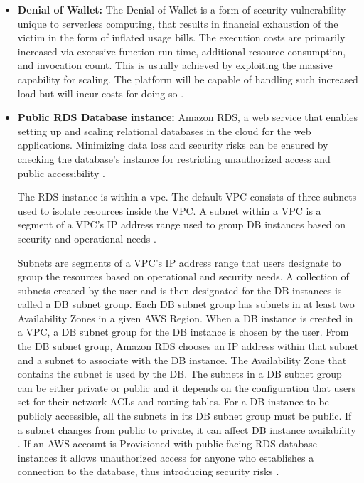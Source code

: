 \begin{itemize}
    \item \textbf{Denial of Wallet:} The Denial of Wallet is a form of security vulnerability unique to serverless
    computing,
    that results in financial exhaustion of the victim in the form of inflated usage bills.
    The execution costs are
    primarily increased via excessive function run time, additional resource consumption, and invocation count.
    This
    is usually achieved by exploiting the massive capability for scaling.
    The platform will be capable of handling
    such increased load but will incur costs for doing so \cite{54} \cite{55} \cite{56}.
\end{itemize}

\begin{itemize}
    \item \textbf{Public RDS Database instance:} Amazon RDS, a web service that enables setting up and scaling
    relational databases in the cloud for the web applications.
    Minimizing data loss and security risks can be
    ensured by checking the database’s instance for restricting unauthorized access and public accessibility \cite{57}.

    The RDS instance is within a \gls{vpc}.
    The default VPC consists of three subnets used to 
    isolate resources inside the VPC. A subnet within a 
    VPC is a segment of a VPC's IP address range used to 
    group DB instances based on security and operational 
    needs \cite{58}.

    Subnets are segments of a VPC's IP address range that users designate to group the resources based on operational and security needs.
    A collection of subnets created by the user and is then designated for the DB instances is called a DB subnet group.
    Each DB subnet group has subnets in at least two Availability Zones in a given AWS Region.
    When a DB instance is created in a VPC, a DB subnet group for the DB instance is chosen by the user.
    From the DB subnet group, Amazon RDS chooses an IP address within that subnet and a subnet to associate with the DB instance.
    The Availability Zone that contains the subnet is used by the DB. The subnets in a DB subnet group can be either private or public and it depends on the configuration that users set for their network ACLs and routing tables. For a DB instance to be publicly accessible, all the subnets in its DB subnet group must be public. If a subnet changes from public to private, it can affect DB instance availability \cite{58}. If an AWS account is Provisioned with public-facing RDS database instances it allows unauthorized access for anyone who establishes a connection to the database, thus introducing security risks \cite{59}.
\end{itemize}


